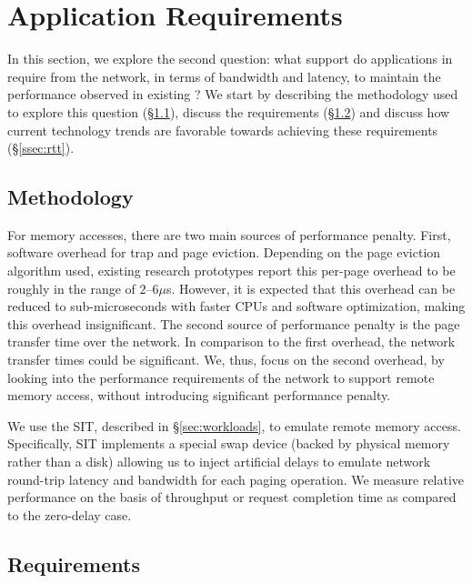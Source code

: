 \section{\dis Application Requirements}
\label{sec:requirements}
In this section, we explore the second question: what support do applications in \dis require from the network, in terms of bandwidth and latency, to maintain the performance observed in existing \pdis? We start by describing the methodology used to explore this question (\S\ref{ssec:rmethod}), discuss the requirements (\S\ref{ssec:rr}) and discuss how current technology trends are favorable towards achieving these requirements (\S\ref{ssec:rtt}).

\subsection{Methodology}
\label{ssec:rmethod}
For memory accesses, there are two main sources of performance penalty. First, software overhead for trap and page eviction. Depending on the page eviction algorithm used, existing research prototypes report this per-page overhead to be roughly in the range of $2$--$6\mu$s. However, it is expected that this overhead can be reduced to sub-microseconds with faster CPUs and software optimization, making this overhead insignificant. The second source of performance penalty is the page transfer time over the network. In comparison to the first overhead, the network transfer times could be significant. We, thus, focus on the second overhead, by looking into the performance requirements of the network to support remote memory access, without introducing significant performance penalty.

We use the SIT, described in \S\ref{sec:workloads}, to emulate remote memory access. Specifically, SIT implements a special swap device (backed by physical memory rather than a disk) allowing us to inject artificial delays to emulate network round-trip latency and bandwidth for each paging operation. We measure relative performance on the basis of throughput or request completion time as compared to the zero-delay case. 

\subsection{Requirements}
\label{ssec:rr}

